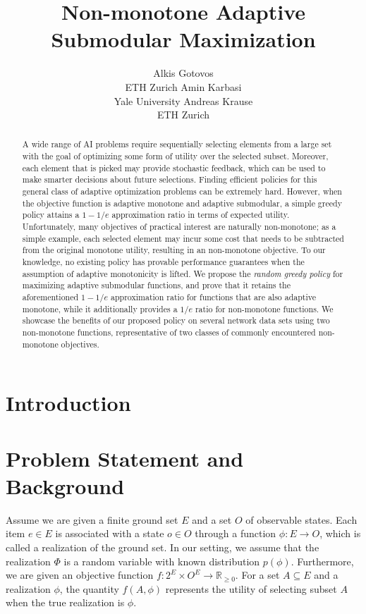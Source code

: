 \documentclass{article}
\title{Non-monotone Adaptive Submodular Maximization}
\author{Alkis Gotovos\\
ETH Zurich
\And
Amin Karbasi\\
Yale University
\And
Andreas Krause\\
ETH Zurich}
\begin{document}
\maketitle

\begin{abstract}
A wide range of AI problems require sequentially selecting elements from a large set with the goal of optimizing some form of utility over the selected subset.
Moreover, each element that is picked may provide stochastic feedback, which can be used to make smarter decisions about future selections.
Finding efficient policies for this general class of adaptive optimization problems can be extremely hard.
However, when the objective function is adaptive monotone and adaptive submodular, a simple greedy policy attains a $1-1/e$ approximation ratio in terms of expected utility.
Unfortunately, many objectives of practical interest are naturally non-monotone; as a simple example, each selected element may incur some cost that needs to be subtracted from the original monotone utility, resulting in an non-monotone objective.
To our knowledge, no existing policy has provable performance guarantees when the assumption of adaptive monotonicity is lifted.
We propose the \emph{random greedy policy} for maximizing adaptive submodular functions, and prove that it retains the aforementioned $1-1/e$ approximation ratio for functions that are also adaptive monotone, while it additionally provides a $1/e$ ratio for non-monotone functions.
We showcase the benefits of our proposed policy on several network data sets using two non-monotone functions, representative of two classes of commonly encountered non-monotone objectives.
\end{abstract}

\section{Introduction}

\clearpage
\section{Problem Statement and Background}
Assume we are given a finite ground set $E$ and a set $O$ of observable states.
Each item $e \in E$ is associated with a state $o \in O$ through a function $\phi : E \to O$, which is called a realization of the ground set.
In our setting, we assume that the realization $\Phi$ is a random variable with known distribution $p(\phi)$.
Furthermore, we are given an objective function $f : 2^E \times O^E \to \mathbb{R}_{\geq 0}$.
For a set $A \subseteq E$ and a realization $\phi$, the quantity $f(A, \phi)$ represents the utility of selecting subset $A$ when the true realization is $\phi$.
\end{document}
